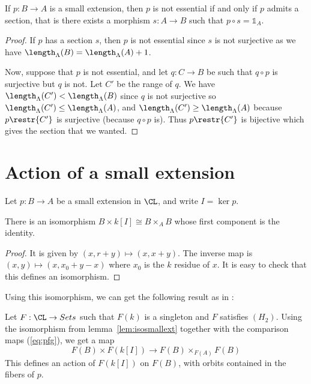 \begin{lemma}
  \label{lem:14ii}
  \leanok
  If $p : B \to A$ is a small extension, then $p$ is not essential
  if and only if $p$ admits a section, that is there exists a morphism
  $s : A \to B$ such that
  $p \circ s = \mathbb{1}_A$.
\end{lemma}

\begin{proof}
  \leanok
  If $p$ has a section $s$, then $p$ is not essential since $s$
  is not surjective as we have
  $\length_\Lambda (B) = \length_\Lambda (A) + 1$.

  Now, suppose that $p$ is not essential, and let $q : C \to B$ be such that
  $q \circ p$ is surjective but $q$ is not. Let $C'$ be the
  range of $q$. We have $\length_\Lambda (C') < \length_\Lambda (B)$
  since $q$ is not surjective so
  $\length_\Lambda (C') \le \length_\Lambda (A)$,
  and $\length_\Lambda (C') \ge \length_\Lambda (A)$ because
  $p\restr{C'}$ is surjective (because $q \circ p$ is).
  Thus $p\restr{C'}$ is bijective
  which gives the section that we wanted.
\end{proof}

\section{Action of a small extension}

Let $p : B \to A$ be a small extension in $\CL$, and write $I = \ker p$.

\begin{lemma}
  \label{lem:isosmallext}
  \leanok
  There is an isomorphism $B \times k[I] \cong B \times_A B$ whose
  first component is the identity.
\end{lemma}

\begin{proof}
  \leanok
  It is given by $(x, r + y) \mapsto (x, x + y)$.
  The inverse map is $(x, y) \mapsto (x, x_0 + y - x)$ where $x_0$ is
  the $k$ residue of $x$.
  It is easy to check that this defines an isomorphism.
\end{proof}

Using this isomorphism, we can get the following result
as in \cite[Remark 2.15]{Sch}:
\begin{lemma}
  \label{lem:action}
  \leanok
  Let $F : \CL \to Sets$ such that $F(k)$ is a singleton and $F$
  satisfies
  $(H_2)$. Using the isomorphism from lemma~\ref{lem:isosmallext}
  together with the comparison maps (\cref{eq:pfg}),
  we get a map
  $$F(B) \times F(k[I]) \to F(B) \times_{F(A)} F(B)$$
  This defines an action of $F(k[I])$ on $F(B)$, with orbits contained
  in the fibers of $p$.
\end{lemma}

